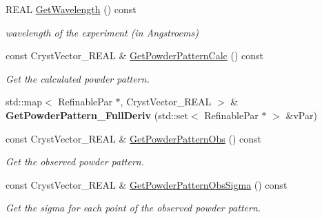 \begin{DoxyCompactItemize}
\mbox{\label{class_obj_cryst_1_1_powder_pattern_a135e6cb36ade4ad2dafef04f91d53b96}} 
R\+E\+AL \mbox{\hyperlink{class_obj_cryst_1_1_powder_pattern_a135e6cb36ade4ad2dafef04f91d53b96}{Get\+Wavelength}} () const
\begin{DoxyCompactList}\small\item\em wavelength of the experiment (in Angstroems) \end{DoxyCompactList}\item 
\mbox{\label{class_obj_cryst_1_1_powder_pattern_ae0ebde9b0093bc3572a0d29c73aa346b}} 
const Cryst\+Vector\+\_\+\+R\+E\+AL \& \mbox{\hyperlink{class_obj_cryst_1_1_powder_pattern_ae0ebde9b0093bc3572a0d29c73aa346b}{Get\+Powder\+Pattern\+Calc}} () const
\begin{DoxyCompactList}\small\item\em Get the calculated powder pattern. \end{DoxyCompactList}\item 
\mbox{\label{class_obj_cryst_1_1_powder_pattern_a21865d0353c7c7ddeca2704020ba9784}} 
std\+::map$<$ Refinable\+Par $\ast$, Cryst\+Vector\+\_\+\+R\+E\+AL $>$ \& {\bfseries Get\+Powder\+Pattern\+\_\+\+Full\+Deriv} (std\+::set$<$ Refinable\+Par $\ast$ $>$ \&v\+Par)
\item 
\mbox{\label{class_obj_cryst_1_1_powder_pattern_ac698a4b812f7fc1f8083369a2a8bec2d}} 
const Cryst\+Vector\+\_\+\+R\+E\+AL \& \mbox{\hyperlink{class_obj_cryst_1_1_powder_pattern_ac698a4b812f7fc1f8083369a2a8bec2d}{Get\+Powder\+Pattern\+Obs}} () const
\begin{DoxyCompactList}\small\item\em Get the observed powder pattern. \end{DoxyCompactList}\item 
\mbox{\label{class_obj_cryst_1_1_powder_pattern_afde5ea72083e432e3aa83e43fdfebb16}} 
const Cryst\+Vector\+\_\+\+R\+E\+AL \& \mbox{\hyperlink{class_obj_cryst_1_1_powder_pattern_afde5ea72083e432e3aa83e43fdfebb16}{Get\+Powder\+Pattern\+Obs\+Sigma}} () const
\begin{DoxyCompactList}\small\item\em Get the sigma for each point of the observed powder pattern. \end{DoxyCompactList}\item 

\end{DoxyCompactItemize}
